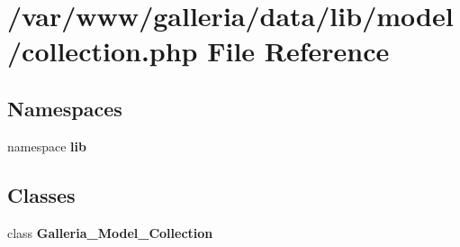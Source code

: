 \section{/var/www/galleria/data/lib/model/collection.php File Reference}
\label{collection_8php}
\subsection*{Namespaces}
\begin{CompactItemize}
\item 
namespace {\bf lib}
\end{CompactItemize}
\subsection*{Classes}
\begin{CompactItemize}
\item 
class {\bf Galleria\_\-Model\_\-Collection}
\end{CompactItemize}
